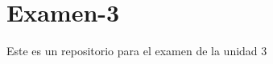 \chapter{Examen-\/3}
\hypertarget{md__c_1_2_users_2erf53_2_one_drive_2_escritorio_2_examen-3_2_r_e_a_d_m_e}{}\label{md__c_1_2_users_2erf53_2_one_drive_2_escritorio_2_examen-3_2_r_e_a_d_m_e}
\label{md__c_1_2_users_2erf53_2_one_drive_2_escritorio_2_examen-3_2_r_e_a_d_m_e_autotoc_md0}%
%


Este es un repositorio para el examen de la unidad 3 